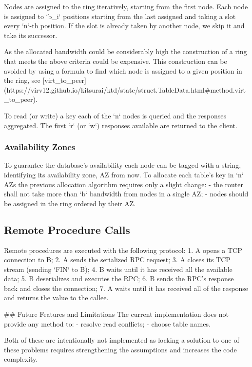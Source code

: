 Nodes are assigned to the ring iteratively, starting from the first node.
Each node is assigned to `b_i` positions starting from the last assigned and taking a slot every `n`-th position.
If the slot is already taken by another node, we skip it and take its successor.

As the allocated bandwidth could be considerably high the construction of a ring 
 that meets the above criteria could be expensive.
This construction can be avoided by using a formula
 to find which node is assigned to a given position in the ring,
 see [virt_to_peer](https://virv12.github.io/kitsurai/ktd/state/struct.TableData.html#method.virt_to_peer).

To read (or write) a key each of the `n` nodes is queried and the responses aggregated.
The first `r` (or `w`) responses available are returned to the client.

\subsubsection{Availability Zones}
\label{subsubsec:availability-zones}

To guarantee the database's availability each node can be tagged with a string, 
 identifying its availability zone, AZ from now.
To allocate each table's key in `n` AZs the previous allocation algorithm requires only a slight change:
- the router shall not take more than `b` bandwidth from nodes in a single AZ;
- nodes should be assigned in the ring ordered by their AZ.

\subsection{Remote Procedure Calls}
\label{subsec:rpc}

Remote procedures are executed with the following protocol:
1. A opens a TCP connection to B;
2. A sends the serialized RPC request;
3. A closes its TCP stream (sending `FIN` to B);
4. B waits until it has received all the available data;
5. B deserializes and executes the RPC;
6. B sends the RPC's response back and closes the connection;
7. A waits until it has received all of the response and returns the value to the callee.

## Future Features and Limitations
The current implementation does not provide any method to:
- resolve read conflicts;
- choose table names.

Both of these are intentionally not implemented as locking a solution to one of these problems
 requires strengthening the assumptions and increases the code complexity.

